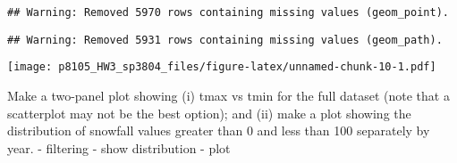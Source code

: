 \documentclass[]{article}
\begin{document}
\begin{verbatim}
## Warning: Removed 5970 rows containing missing values (geom_point).
\end{verbatim}

\begin{verbatim}
## Warning: Removed 5931 rows containing missing values (geom_path).
\end{verbatim}

\texttt{[image: p8105\_HW3\_sp3804\_files/figure-latex/unnamed-chunk-10-1.pdf]}

Make a two-panel plot showing (i) tmax vs tmin for the full dataset
(note that a scatterplot may not be the best option); and (ii) make a
plot showing the distribution of snowfall values greater than 0 and less
than 100 separately by year. - filtering - show distribution - plot
\end{document}
